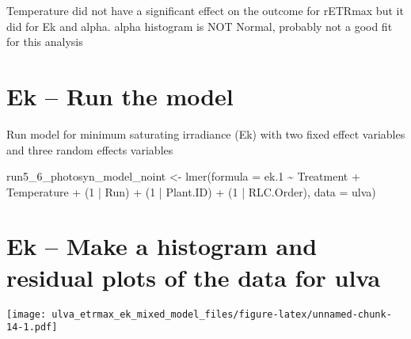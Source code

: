 \documentclass[
]{article}
\newenvironment{Shaded}{\begin{snugshade}}{\end{snugshade}}
\newcommand{\AttributeTok}[1]{\textcolor[rgb]{0.77,0.63,0.00}{#1}}
\newcommand{\ConstantTok}[1]{\textcolor[rgb]{0.00,0.00,0.00}{#1}}
\newcommand{\DecValTok}[1]{\textcolor[rgb]{0.00,0.00,0.81}{#1}}
\newcommand{\FloatTok}[1]{\textcolor[rgb]{0.00,0.00,0.81}{#1}}
\newcommand{\FunctionTok}[1]{\textcolor[rgb]{0.00,0.00,0.00}{#1}}
\newcommand{\NormalTok}[1]{#1}
\newcommand{\OtherTok}[1]{\textcolor[rgb]{0.56,0.35,0.01}{#1}}
\newcommand{\SpecialCharTok}[1]{\textcolor[rgb]{0.00,0.00,0.00}{#1}}
\newcommand{\StringTok}[1]{\textcolor[rgb]{0.31,0.60,0.02}{#1}}
\begin{document}
Temperature did not have a significant effect on the outcome for rETRmax
but it did for Ek and alpha. alpha histogram is NOT Normal, probably not
a good fit for this analysis

\hypertarget{ek-run-the-model}{%
\section{Ek -- Run the model}\label{ek-run-the-model}}

Run model for minimum saturating irradiance (Ek) with two fixed effect
variables and three random effects variables

\begin{Shaded}
\begin{Highlighting}[]
\NormalTok{run5\_6\_photosyn\_model\_noint }\OtherTok{\textless{}{-}} \FunctionTok{lmer}\NormalTok{(}\AttributeTok{formula =}\NormalTok{ ek}\FloatTok{.1} \SpecialCharTok{\textasciitilde{}}\NormalTok{ Treatment }\SpecialCharTok{+}\NormalTok{ Temperature }
                                    \SpecialCharTok{+}\NormalTok{ (}\DecValTok{1} \SpecialCharTok{|}\NormalTok{ Run) }\SpecialCharTok{+}\NormalTok{ (}\DecValTok{1} \SpecialCharTok{|}\NormalTok{ Plant.ID) }\SpecialCharTok{+}\NormalTok{ (}\DecValTok{1} \SpecialCharTok{|}\NormalTok{ RLC.Order), }
                                    \AttributeTok{data =}\NormalTok{ ulva)}
\end{Highlighting}
\end{Shaded}

\hypertarget{ek-make-a-histogram-and-residual-plots-of-the-data-for-ulva}{%
\section{Ek -- Make a histogram and residual plots of the data for
ulva}\label{ek-make-a-histogram-and-residual-plots-of-the-data-for-ulva}}

\begin{Shaded}
\end{Shaded}

\texttt{[image: ulva\_etrmax\_ek\_mixed\_model\_files/figure-latex/unnamed-chunk-14-1.pdf]}
\end{document}
